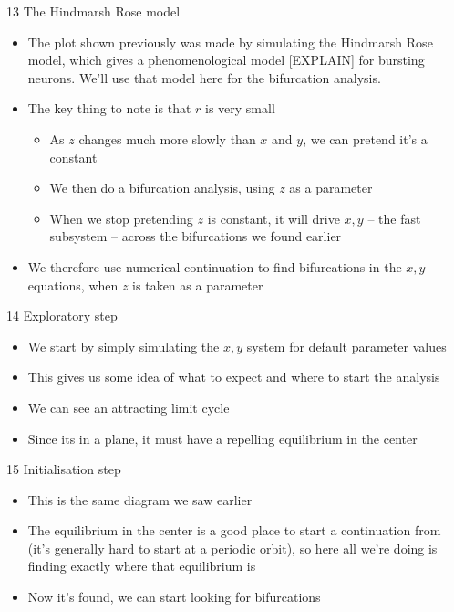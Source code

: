 \documentclass[presentation]{beamer}
\begin{document}
\begin{frame}[label={sec:org372215b}]{13 The Hindmarsh Rose model}
\begin{itemize}
\item The plot shown previously was made by simulating the Hindmarsh Rose model, which gives a phenomenological model [EXPLAIN] for bursting neurons. We'll use that model here for the bifurcation analysis.
\item The key thing to note is that \(r\) is very small
\begin{itemize}
\item As \(z\) changes much more slowly than \(x\) and \(y\), we can pretend it's a constant
\item We then do a bifurcation analysis, using \(z\) as a parameter
\item When we stop pretending \(z\) is constant, it will drive \(x,y\) -- the fast subsystem -- across the bifurcations we found earlier
\end{itemize}
\item We therefore use numerical continuation to find bifurcations in the \(x,y\) equations, when \(z\) is taken as a parameter
\end{itemize}
\end{frame}


\begin{frame}[label={sec:org27d5b72}]{14 Exploratory step}
\begin{itemize}
\item We start by simply simulating the \(x,y\) system for default parameter values
\item This gives us some idea of what to expect and where to start the analysis
\item We can see an attracting limit cycle
\item Since its in a plane, it must have a repelling equilibrium in the center
\end{itemize}
\end{frame}

\begin{frame}[label={sec:orgb6f45b5}]{15 Initialisation step}
\begin{itemize}
\item This is the same diagram we saw earlier
\item The equilibrium in the center is a good place to start a continuation from (it's generally hard to start at a periodic orbit), so here all we're doing is finding exactly where that equilibrium is
\item Now it's found, we can start looking for bifurcations
\end{itemize}
\end{frame}
\end{document}
